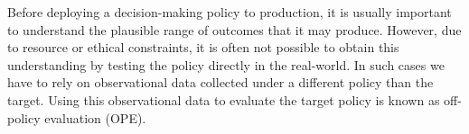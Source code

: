 Before deploying a decision-making policy to production, it is usually important to understand the plausible range of outcomes that it may produce.
However, due to resource or ethical constraints, it is often not possible to obtain this understanding by testing the policy directly in the real-world.
In such cases we have to rely on observational data collected under a different policy than the target.
Using this observational data to evaluate the target policy is known as off-policy evaluation (OPE).%






